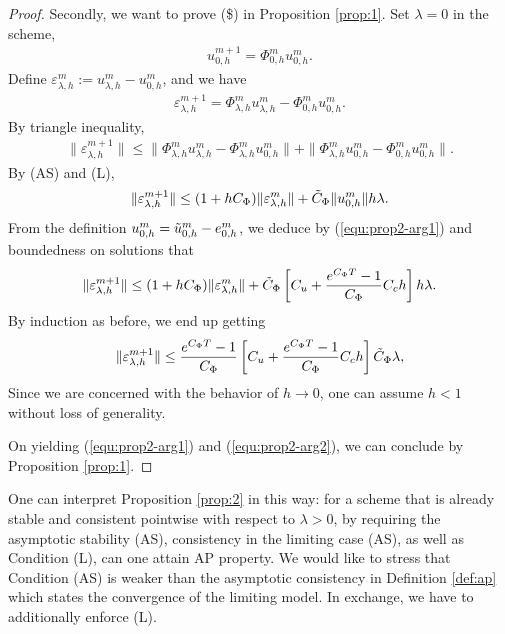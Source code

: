 \documentclass{report}
\begin{document}
\begin{proof}[Proof]
Secondly, we want to prove (\$) in Proposition \ref{prop:1}. Set $\lambda = 0$ in the scheme,
\begin{align*}
    u_{0,h}^{m+1} = \Phi^m_{0,h} u_{0,h}^{m}.
\end{align*}
Define $\varepsilon^{m}_{\lambda,h} := u_{\lambda,h}^{m} - u_{0,h}^{m}$, and we have
\begin{align*}
    \varepsilon^{m+1}_{\lambda,h} = \Phi^m_{\lambda,h} u_{\lambda,h}^{m} - \Phi^m_{0,h} u_{0,h}^{m}.
\end{align*}
By triangle inequality,
\begin{align*}
    \|\varepsilon^{m+1}_{\lambda,h}\| \leq \|\Phi^m_{\lambda,h} u_{\lambda,h}^{m} - \Phi^m_{\lambda,h} u_{0,h}^{m}\| + \|\Phi^m_{\lambda,h} u_{0,h}^{m} - \Phi^m_{0,h} u_{0,h}^{m}\|.
\end{align*}
By (AS) and (L),
\begin{align*}
    \|\varepsilon^{m+1}_{\lambda,h}\| \leq (1+hC_\Phi)\|\varepsilon^{m}_{\lambda,h}\| + \Tilde{C}_{\Phi}\|u_{0,h}^{m}\|h\lambda.
\end{align*}
From the definition $u_{0,h}^{m} = \Tilde{u}_{0,h}^{m} - e_{0,h}^{m}$, we deduce by (\ref{equ:prop2-arg1}) and boundedness on solutions that
\begin{align} \label{equ:prop2-arg2}
    \|\varepsilon^{m+1}_{\lambda,h}\| \leq (1+hC_\Phi)\|\varepsilon^{m}_{\lambda,h}\| + \Tilde{C}_{\Phi}\left[C_u + \frac{e^{C_\Phi T}-1}{C_\Phi}C_ch\right]h\lambda.
\end{align}
By induction as before, we end up getting
\begin{align*}
    \|\varepsilon^{m+1}_{\lambda,h}\| \leq \frac{e^{C_\Phi T}-1}{C_\Phi}\left[C_u + \frac{e^{C_\Phi T}-1}{C_\Phi}C_ch\right]\Tilde{C}_{\Phi}\lambda,
\end{align*}
Since we are concerned with the behavior of $h\rightarrow0$, one can assume $h < 1$ without loss of generality.

On yielding (\ref{equ:prop2-arg1}) and (\ref{equ:prop2-arg2}), we can conclude by Proposition \ref{prop:1}.
\end{proof}

One can interpret Proposition \ref{prop:2} in this way: for a scheme that is already stable and consistent pointwise with respect to $\lambda > 0$, by requiring the asymptotic stability (AS), consistency in the limiting case (AS), as well as Condition (L), can one attain AP property. We would like to stress that Condition (AS) is weaker than the asymptotic consistency in Definition \ref{def:ap} which states the convergence of the limiting model. In exchange, we have to additionally enforce (L). 
\end{document}
